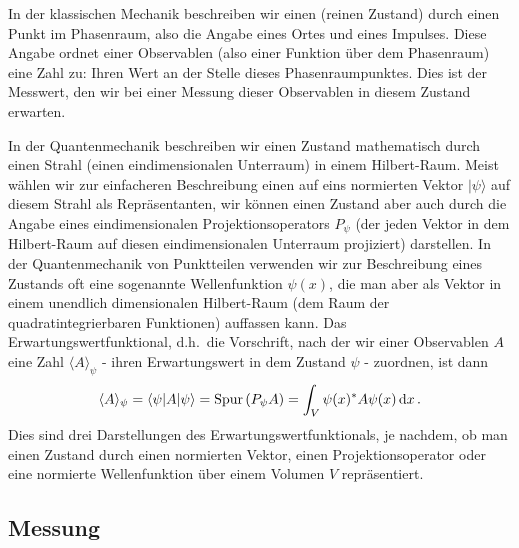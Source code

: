 In der klassischen Mechanik beschreiben wir einen (reinen Zustand) durch einen Punkt im
Phasenraum, also die Angabe eines Ortes und eines Impulses. Diese Angabe ordnet einer
Observablen (also einer Funktion \"uber dem Phasenraum) eine Zahl zu: Ihren Wert an der
Stelle dieses Phasenraumpunktes. Dies ist der Messwert, den wir bei einer Messung dieser
Observablen in diesem Zustand erwarten. 

In der Quantenmechanik beschreiben wir einen Zustand mathematisch durch einen Strahl
(einen eindimensionalen Unterraum) in einem Hilbert-Raum. Meist w\"ahlen wir zur einfacheren
Beschreibung einen auf eins normierten Vektor $|\psi\rangle$ auf diesem Strahl als Repr\"asentanten, wir
k\"onnen einen Zustand aber auch durch die Angabe eines eindimensionalen Projektionsoperators $P_\psi$
(der jeden Vektor in dem Hilbert-Raum auf diesen eindimensionalen Unterraum projiziert)
darstellen. In der Quantenmechanik von Punktteilen verwenden wir zur Beschreibung eines
Zustands oft eine sogenannte Wellenfunktion $\psi(x)$, die man aber als Vektor in einem unendlich dimensionalen
Hilbert-Raum (dem Raum der quadratintegrierbaren Funktionen) auffassen kann. 
Das Erwartungswertfunktional, d.h.\ die Vorschrift, nach der
wir einer Observablen $A$ eine Zahl $\langle A \rangle_\psi$ - ihren Erwartungswert in dem Zustand $\psi$ - zuordnen, ist
dann 
\begin{equation}
       \langle A \rangle_\psi = \langle \psi | A |  \psi \rangle  = {\rm Spur}\,(P_\psi A) =
                \int_V \psi(x)^* A \psi(x)\,{\rm d} x \, .  
\end{equation}
Dies sind drei Darstellungen des Erwartungswertfunktionals, je nachdem, ob man einen Zustand durch
einen normierten Vektor, einen Projektionsoperator oder eine normierte Wellenfunktion \"uber einem Volumen 
$V$ repr\"asentiert. 


\subsection{Messung}

